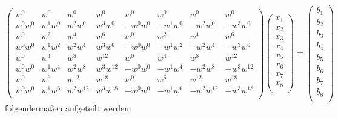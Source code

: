 \begin{equation*}
\left( \begin{array}{cccccccc}
w^{0} & w^{0} & w^{0} & w^{0} & w^{0} & w^{0} & w^{0} & w^{0}\\
w^{0}w^{0} & w^{1}w^{0} & w^{2}w^{0} & w^{3}w^{0} & -w^{0}w^{0} & -w^{1}w^{0} & -w^{2}w^{0} & -w^{3}w^{0}\\
w^{0} & w^{2} & w^{4} & w^{6} & w^{0} & w^{2} & w^{4} & w^{6}\\
w^{0}w^{0} & w^{1}w^{2} & w^{2}w^{4} & w^{3}w^{6} & -w^{0}w^{0} & -w^{1}w^{2} & -w^{2}w^{4} & -w^{3}w^{6}\\
w^{0} & w^{4} & w^{8} & w^{12} & w^{0} & w^{4} & w^{8} & w^{12}\\
w^{0}w^{0} & w^{1}w^{4} & w^{2}w^{8} & w^{3}w^{12} & -w^{0}w^{0} & -w^{1}w^{4} & -w^{2}w^{8} & -w^{3}w^{12}\\
w^{0} & w^{6} & w^{12} & w^{18} & w^{0} & w^{6} & w^{12} & w^{18}\\
w^{0}w^{0} & w^{1}w^{6} & w^{2}w^{12} & w^{3}w^{18} & -w^{0}w^{0} & -w^{1}w^{6} & -w^{2}w^{12} & -w^{3}w^{18}\\
\end{array} \right)
\left( \begin{array}{cccccccc}
x_1\\
x_2\\
x_3\\
x_4\\
x_5\\
x_6\\
x_7\\
x_8\\
\end{array} \right)
=
\left( \begin{array}{cccccccc}
b_1\\
b_2\\
b_3\\
b_4\\
b_5\\
b_6\\
b_7\\
b_8\\
\end{array} \right)
\end{equation*}
folgendermaßen aufgeteilt werden:
